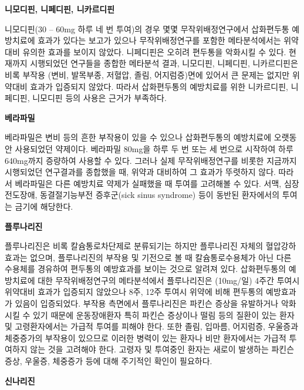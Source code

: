 \documentclass[]{book}
\begin{document}
\textbf{니모디핀, 니페디핀, 니카르디핀}

니모디핀(30 -- 60mg 하루 네 번 투여)의 경우 몇몇 무작위배정연구에서 삽화편두통 예방치료에 효과가 있다는 보고가 있으나 무작위배정연구를 포함한 메타분석에서는 위약대비 유의한 효과를 보이지 않았다. 니페디핀은 오히려 편두통을 악화시킬 수 있다. 현재까지 시행되었던 연구들을 종합한 메타분석 결과, 니모디핀, 니페디핀, 니카르디핀은 비록 부작용 (변비, 발목부종, 저혈압, 졸림, 어지럼증)면에 있어서 큰 문제는 없지만 위약대비 효과가 입증되지 않았다. 따라서 삽화편두통의 예방치료를 위한 니카르디핀, 니페디핀, 니모디핀 등의 사용은 근거가 부족하다.

\textbf{베라파밀}

베라파밀은 변비 등의 흔한 부작용이 있을 수 있으나 삽화편두통의 예방치료에 오랫동안 사용되었던 약제이다. 베라파밀 80mg을 하루 두 번 또는 세 번으로 시작하여 하루 640mg까지 증량하여 사용할 수 있다. 그러나 실제 무작위배정연구를 비롯한 지금까지 시행되었던 연구결과를 종합했을 때, 위약과 대비하여 그 효과가 뚜렷하지 않다. 따라서 베라파밀은 다른 예방치료 약제가 실패했을 때 투여를 고려해볼 수 있다. 서맥, 심장전도장애, 동결절기능부전 증후군(sick sinus syndrome) 등이 동반된 환자에서의 투여는 금기에 해당한다.

\textbf{플루나리진}

플루나리진은 비록 칼슘통로차단제로 분류되기는 하지만 플루나리진 자체의 혈압강하효과는 없으며, 플루나리진의 부작용 및 기전으로 볼 때 칼슘통로수용체가 아닌 다른 수용체를 경유하여 편두통의 예방효과를 보이는 것으로 알려져 있다. 삽화편두통의 예방치료에 대한 무작위배정연구의 메타분석에서 플루나리진은 (10mg/일) 4주간 투여시 위약대비 효과가 입증되지 않았으나 8주, 12주 투여시 위약에 비해 편두통의 예방효과가 있음이 입증되었다. 부작용 측면에서 플루나리진은 파킨슨 증상을 유발하거나 악화시킬 수 있기 때문에 운동장애환자 특히 파킨슨 증상이나 떨림 등의 질환이 있는 환자 및 고령환자에서는 가급적 투여를 피해야 한다. 또한 졸림, 입마름, 어지럼증, 우울증과 체중증가의 부작용이 있으므로 이러한 병력이 있는 환자나 비만 환자에서는 가급적 투여하지 않는 것을 고려해야 한다. 고령자 및 투여중인 환자는 새로이 발생하는 파킨슨 증상, 우울증, 체중증가 등에 대해 주기적인 확인이 필요하다.

\textbf{신나리진}
\end{document}
